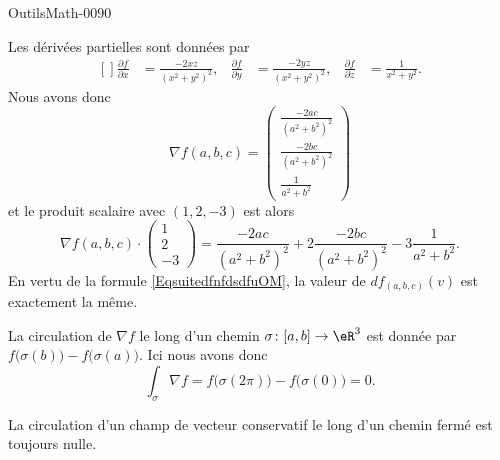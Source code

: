 
\begin{corrige}{OutilsMath-0090}

    Les dérivées partielles sont données par
    \begin{equation}
        \begin{aligned}[]
            \frac{ \partial f }{ \partial x }&=\frac{ -2xz }{ (x^2+y^2)^2 },&\frac{ \partial f }{ \partial y }&=\frac{ -2yz }{ (x^2+y^2)^2 },&\frac{ \partial f }{ \partial z }&=\frac{1}{ x^2+y^2 }.
        \end{aligned}
    \end{equation}
    Nous avons donc
    \begin{equation}
        \nabla f(a,b,c)=\begin{pmatrix}
            \frac{ -2ac }{ (a^2+b^2)^2 }    \\ 
            \frac{ -2bc }{ (a^2+b^2)^2 }    \\ 
            \frac{ 1 }{ a^2+b^2 }    
        \end{pmatrix}
    \end{equation}
    et le produit scalaire avec $(1,2,-3)$ est alors 
    \begin{equation}
        \nabla f(a,b,c)\cdot\begin{pmatrix}
            1    \\ 
            2    \\ 
            -3    
        \end{pmatrix}=
            \frac{ -2ac }{ (a^2+b^2)^2 }  +2        \frac{ -2bc }{ (a^2+b^2)^2 }    -3        \frac{ 1 }{ a^2+b^2 }    .
    \end{equation}
    En vertu de la formule \eqref{EqsuitedfnfdsdfuOM}, la valeur de $df_{(a,b,c)}(v)$ est exactement la même.

    La circulation de $\nabla f$ le long d'un chemin $\sigma\colon \mathopen[ a , b \mathclose]\to \eR^3$ est donnée par $f\big( \sigma(b) \big)-f\big( \sigma(a) \big)$. Ici nous avons donc
    \begin{equation}
        \int_{\sigma}\nabla f=f\big( \sigma(2\pi) \big)-f\big( \sigma(0) \big)=0.
    \end{equation}
    
    La circulation d'un champ de vecteur conservatif le long d'un chemin fermé est toujours nulle.


\end{corrige}
